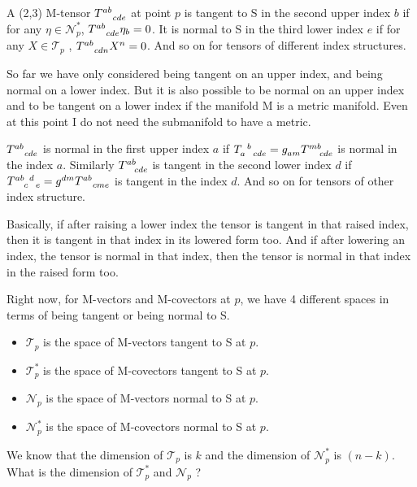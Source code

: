\begin{definition}
    A (2,3) M-tensor $T^{ab}_{\quad cde}$ at point $p$ is tangent to S in the second upper index $ b$  if for any $\eta \in \mathscr{N}^*_p$, $T^{ab}_{\quad cde} \eta_b =0$. It is normal to S in the third lower index $e$ if for any $X \in \mathscr{T}_p$ , $T^{ab}_{\quad cdn}X^n=0$. And so on for tensors of different index structures.
\end{definition}

So far we have only considered being tangent on an upper index, and being normal on a lower index. But it is also possible to be normal on an upper index and to be tangent on a lower index if the manifold M is a metric manifold. Even at this point I do not need the submanifold to have a metric.

\begin{definition}
    $T^{ab}_{\quad cde}$ is normal in the first upper index $a$ if $ T_{a\;\;\;cde}^{\;\;b} = \tt{g}{}{am}\tt{T}{mb}{cde}$ is normal in the index $a$. Similarly $ \tt{T}{ab}{cde}$ is tangent in the second lower index $d$ if $ T^{ab\;\;d}_{\;\;\;\;c\;\;\;e}=g^{dm}T^{ab}_{\quad cme}$ is tangent in the index $d$. And so on for tensors of other index structure. 
\end{definition}

Basically, if after raising a lower index the tensor is tangent in that raised index, then it is tangent in that index in its lowered form too. And if after lowering an index, the tensor is normal in that index, then the tensor is normal in that index in the raised form too.

Right now, for M-vectors and M-covectors at $p$, we have 4 different spaces in terms of being tangent or being normal to S. 

\begin{itemize}
    \item $\mathscr{T}_p$ is the space of M-vectors tangent to S at $p$.
    \item $\mathscr{T}_p^*$ is the space of M-covectors tangent to S at $p$.
    \item $\mathscr{N}_p$ is the space of M-vectors normal to S at $p$.
    \item $\mathscr{N}^*_p$ is the space of M-covectors normal to S at $p$.
\end{itemize}


We know that the dimension of $\mathscr{T}_p$ is $k$ and the dimension of $\mathscr{N}^*_p$ is $(n-k)$. What is the dimension of $\mathscr{T}^*_p$ and $\mathscr{N}_p$ ?


